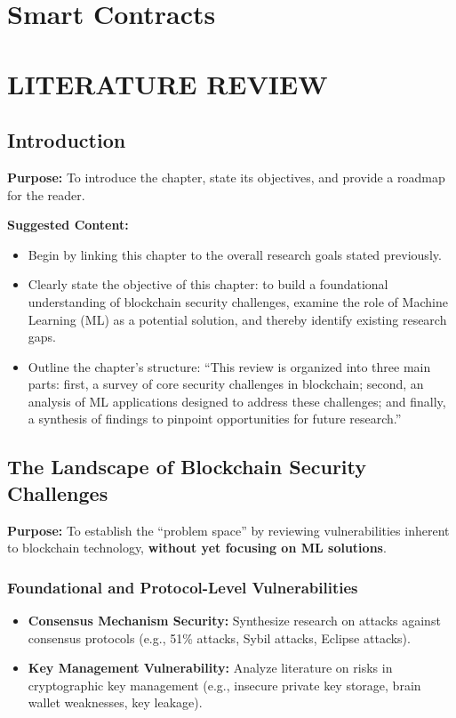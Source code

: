 \section{Smart Contracts}
	
\section{LITERATURE REVIEW}
	
\subsection{Introduction}
\textbf{Purpose:} To introduce the chapter, state its objectives, and provide a roadmap for the reader.
	
\textbf{Suggested Content:}
\begin{itemize}
	\item Begin by linking this chapter to the overall research goals stated previously.
	\item Clearly state the objective of this chapter: to build a foundational understanding of blockchain security challenges, examine the role of Machine Learning (ML) as a potential solution, and thereby identify existing research gaps.
	\item Outline the chapter's structure: ``This review is organized into three main parts: first, a survey of core security challenges in blockchain; second, an analysis of ML applications designed to address these challenges; and finally, a synthesis of findings to pinpoint opportunities for future research.''
\end{itemize}
	
\subsection{The Landscape of Blockchain Security Challenges}
\textbf{Purpose:} To establish the ``problem space'' by reviewing vulnerabilities inherent to blockchain technology, \textbf{without yet focusing on ML solutions}.
	
\subsubsection{Foundational and Protocol-Level Vulnerabilities}
\begin{itemize}
	\item \textbf{Consensus Mechanism Security:} Synthesize research on attacks against consensus protocols (e.g., 51\% attacks, Sybil attacks, Eclipse attacks).
	\item \textbf{Key Management Vulnerability:} Analyze literature on risks in cryptographic key management (e.g., insecure private key storage, brain wallet weaknesses, key leakage).
\end{itemize}
	
